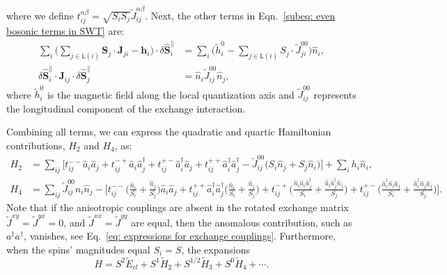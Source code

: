 where we define $t^{\alpha\beta}_{ij} = \sqrt{S_{i}S_{j}} \widetilde{J}^{\alpha\beta}_{ij}$.
Next, the other terms in Eqn.~\eqref{subeq: even bosonic terms in SWT} are:
\begin{equation}
    \begin{split}
    \sum_{i} \Big( \sum_{j \in \mathsf{L}(i)} \mathbf{S}_{j} \cdot \mathbf{J}_{ji} - \mathbf{h}_{i} \Big) \cdot \delta \hat{\mathbf{S}}_{i}^{\parallel} 
    &= 
    \sum_{i} \Big( \widetilde{h}_{i}^{0} - \sum_{j \in \mathsf{L}(i)} S_{j} \cdot \widetilde{J}_{ji}^{00} \Big)  \hat{n}_{i}, \\
    \delta \hat{\mathbf{S}}_{i}^{\parallel} \cdot \mathbf{J}_{ij} \cdot \delta \hat{\mathbf{S}}_{j}^{\parallel}
    &= \hat{n}_{i} \widetilde{J}_{ij}^{00} \hat{n}_{j},
    \end{split}
\end{equation}
where $\widetilde{h}_{i}^{0}$ is the magnetic field along the local quantization axis and $\widetilde{J}_{ij}^{00}$ represents the longitudinal component of the exchange interaction.

Combining all terms, we can express the quadratic and quartic Hamiltonian contributions, $H_{2}$ and $H_{4}$, as:
\begin{align}
    H_{2} &= \sum_{ij} \Big[ t_{ij}^{--} \hat{a}_{i} \hat{a}_{j} + t_{ij}^{-+} \hat{a}_{i}\hat{a}_{j}^{\dagger} + t_{ij}^{+-} \hat{a}_{i}^{\dagger} \hat{a}_{j} + t_{ij}^{++} \hat{a}^{\dagger}_{i} \hat{a}^{\dagger}_{j} - \widetilde{J}_{ij}^{00} \big( S_{i} \hat{n}_{j} + S_{j} \hat{n}_{i} \big) \Big] + \sum_{i} h_{i} \hat{n}_{i}, 
    \label{eq: SWT bosonic H2 in real space}\\
    H_{4} &= \sum_{ij} \widetilde{J}_{ij}^{00} \hat{n}_{i} \hat{n}_{j} - \Big[ t_{ij}^{--} \big( \tfrac{\hat{n}_{i}}{S_{i}} + \tfrac{\hat{n}_{j}}{S_{j}} \big) \hat{a}_{i} \hat{a}_{j} + t_{ij}^{++} \hat{a}^{\dagger}_{i} \hat{a}^{\dagger}_{j} \big( \tfrac{\hat{n}_{i}}{S_{i}} + \tfrac{\hat{n}_{j}}{S_{j}} \big) + t_{ij}^{-+} \big( \tfrac{\hat{n}_{i} \hat{a}_{i} \hat{a}_{j}^{\dagger}}{S_{i}} + \tfrac{\hat{a}_{i} \hat{a}_{j}^{\dagger} \hat{n}_{j}}{S_{j}} \big) + t_{ij}^{+-} \big( \tfrac{\hat{a}_{i}^{\dagger} \hat{n}_{i} \hat{a}_{j}}{S_{i}} + \tfrac{\hat{a}_{i}^{\dagger} \hat{n}_{j} \hat{a}_{j}}{S_{j}} \big) \Big]. 
    \label{eq: SWT bosonic H4 in real space}
\end{align}
Note that if the anisotropic couplings are absent in the rotated exchange matrix $\widetilde{J}^{xy} = \widetilde{J}^{yx} = 0$, and $\widetilde{J}^{xx} = \widetilde{J}^{yy}$ are equal, then the anomalous contribution, such as $a^{\dagger}a^{\dagger}$, vanishes, see Eq.~\eqref{eq: expressions for exchange couplings}. 
Furthermore, when the spins' magnitudes equal $S_{i} = S$, the expansions 
\begin{equation}
    H = S^{2} \tilde{E}_{cl} + S^{1} \tilde{H}_2 + S^{1/2} \tilde{H}_3 + S^{0} \tilde{H}_4 + \cdots.
\end{equation}


